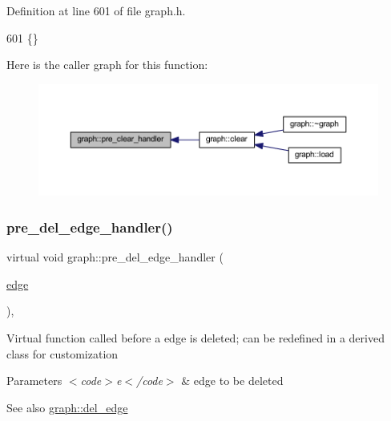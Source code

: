 Definition at line 601 of file graph.\+h.


\begin{DoxyCode}
601 \{\}
\end{DoxyCode}
Here is the caller graph for this function\+:
\nopagebreak
\begin{figure}[H]
\begin{center}
\leavevmode
\includegraphics[width=350pt]{classgraph_a16ccad78837d16be59854549cd2d847a_icgraph}
\end{center}
\end{figure}
\mbox{\label{classgraph_a2cd0986dc5bcbfdbf0635c39e610784b}} 
\subsubsection{\texorpdfstring{pre\+\_\+del\+\_\+edge\+\_\+handler()}{pre\_del\_edge\_handler()}}
{\footnotesize\ttfamily virtual void graph\+::pre\+\_\+del\+\_\+edge\+\_\+handler (\begin{DoxyParamCaption}\item[{\mbox{\hyperlink{classedge}{edge}}}]{ }\end{DoxyParamCaption})\hspace{0.3cm}{\ttfamily [inline]}, {\ttfamily [virtual]}}

Virtual function called before a edge is deleted; can be redefined in a derived class for customization


\begin{DoxyParams}{Parameters}
{\em $<$code$>$e$<$/code$>$} & edge to be deleted \\
\hline
\end{DoxyParams}
\begin{DoxySeeAlso}{See also}
\mbox{\hyperlink{classgraph_ad9356508c49c542dfd4b7169297387c6}{graph\+::del\+\_\+edge}} 
\end{DoxySeeAlso}


